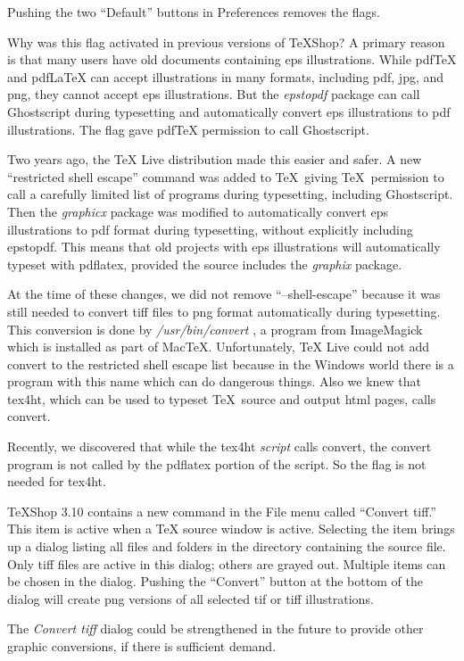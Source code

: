\documentclass[11pt, oneside]{amsart}
\begin{document}
Pushing the two ``Default'' buttons in Preferences removes the flags.

Why was this flag activated in previous versions of TeXShop? A primary reason is that many users have old documents containing eps illustrations. While pdfTeX
and pdfLaTeX can accept illustrations in many formats, including pdf, jpg, and png, they cannot accept eps illustrations. But the {\em epstopdf} package can call  Ghostscript during typesetting and automatically convert eps illustrations to pdf illustrations. The flag gave pdfTeX permission to call Ghostscript.

Two years ago, the TeX Live distribution made this easier and safer. A new ``restricted shell escape'' command was added to \TeX\ giving \TeX\ permission to call a carefully limited list of programs during typesetting, including Ghostscript. Then the {\em graphicx} package was modified to automatically convert eps illustrations to pdf format during typesetting, without explicitly including epstopdf. This means that old projects with eps illustrations will automatically typeset with pdflatex, provided the source includes the {\em graphix} package. 

At the time of these changes, we did not remove ``--shell-escape'' because it was still needed to convert tiff files to png format automatically during typesetting. This conversion is done by {\em /usr/bin/convert} , a program from ImageMagick which is installed as part of MacTeX. Unfortunately, TeX Live could not add convert to the restricted
shell escape list because in the Windows world there is a program with this name which can do dangerous things. Also we knew that tex4ht, which can be used to typeset \TeX\ source and output html pages, calls convert.

Recently, we discovered that while the tex4ht {\em script} calls convert, the convert program is not called by the pdflatex portion of the script. So the flag is not needed for
tex4ht. 

TeXShop 3.10 contains a new command in the File menu called ``Convert tiff.'' This item is active when a TeX source window is active. Selecting the item brings up a  dialog listing all files and folders in the
directory containing the source file. Only tiff files are active in this dialog; others are grayed out. Multiple items can be chosen in the dialog. Pushing the  ``Convert''
button at the bottom of the dialog will create png versions of all selected tif or tiff illustrations. 

The {\em Convert tiff} dialog could be strengthened in the future to provide other graphic conversions, if there is sufficient demand.
\end{document}
